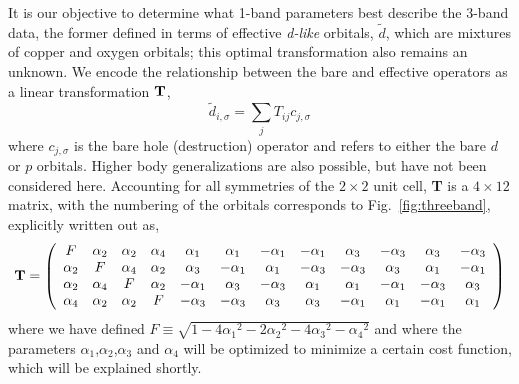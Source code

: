 It is our objective to determine what 1-band parameters best describe the 3-band data, the former defined 
in terms of effective \textit{d-like} orbitals, $\tilde{d}$, which are mixtures of copper and oxygen orbitals; 
this optimal transformation also remains an unknown. We encode the relationship between the 
bare and effective operators as a linear transformation ${\bf T}$, 
\begin{equation}
	\tilde{d}_{i,\sigma} = \sum_{j} T_{ij} c_{j,\sigma}
\end{equation}
where $c_{j,\sigma}$ is the bare hole (destruction) operator and refers to either the bare $d$ or $p$ orbitals. 
Higher body generalizations are also possible, but have not been considered here. 
Accounting for all symmetries of the $2\times2$ unit cell, {\bf T} is a $4 \times 12 $ matrix, with 
the numbering of the orbitals corresponds to Fig.~\ref{fig:threeband}, explicitly written out as, 
\begin{eqnarray}
{\bf T} = 
\left(
\begin{array}{cccccccccccc}
F        & \alpha_2 &        \alpha_2 &  \alpha_4 & \alpha_1 & \alpha_1 & -\alpha_1 & -\alpha_1 & \alpha_3 & -\alpha_3 & \alpha_3 & -\alpha_3 \\
\alpha_2 &  F       &        \alpha_4 &  \alpha_2 & \alpha_3 & -\alpha_1 & \alpha_1 & -\alpha_3 & -\alpha_3 & \alpha_3 & \alpha_1 & -\alpha_1 \\
\alpha_2 & \alpha_4 & F               &  \alpha_2 & -\alpha_1 & \alpha_3 & -\alpha_3 & \alpha_1 & \alpha_1 & -\alpha_1 & -\alpha_3 & \alpha_3 \\
\alpha_4 & \alpha_2 & \alpha_2        &   F       & -\alpha_3 & -\alpha_3 & \alpha_3 & \alpha_3 & -\alpha_1 & \alpha_1 & -\alpha_1 & \alpha_1 \\
\end{array}
\right)
\end{eqnarray}
where we have defined $F \equiv \sqrt{1-4{\alpha_1}^2 - 2{\alpha_2}^2 - 4 {\alpha_3}^2 -{\alpha_4}^2}$ and 
where the parameters $\alpha_1$,$\alpha_2$,$\alpha_3$ and $\alpha_4$ will be optimized to minimize a 
certain cost function, which will be explained shortly. 

